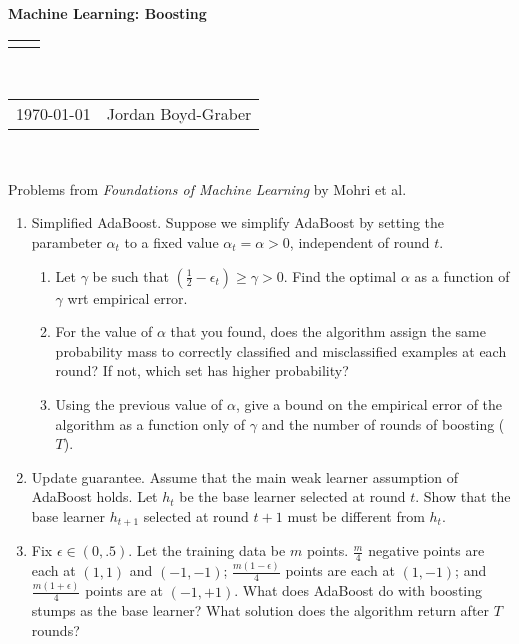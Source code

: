 \documentclass[12pt]{article}
\renewcommand{\title}[1]{\textbf{#1}\\}
\renewcommand{\line}{\begin{tabularx}{\textwidth}{X>{\raggedleft}X}\hline\\\end{tabularx}\\[-0.5cm]}
\newcommand{\leftright}[2]{\begin{tabularx}{\textwidth}{X>{\raggedleft}X}#1%
& #2\\\end{tabularx}\\[-0.5cm]}
\begin{document}
\title{Machine Learning: Boosting}
\line
\leftright{\today}{Jordan Boyd-Graber} %

\begin{center}
  Problems from \emph{Foundations of Machine Learning} by Mohri et al.
\end{center}

\begin{enumerate}
  \item Simplified AdaBoost.  Suppose we simplify AdaBoost by setting
    the parambeter $\alpha_t$ to a fixed value $\alpha_t = \alpha> 0$,
    independent of round $t$.
    \begin{enumerate}
      \item Let $\gamma$ be such that $\left(\frac{1}{2} - \epsilon_t \right)
        \geq \gamma > 0$.  Find the optimal $\alpha$ as a function of $\gamma$
        wrt empirical error.

     \item For the value of $\alpha$ that you found, does the algorithm assign
       the same probability mass to correctly classified and misclassified
       examples at each round?  If not, which set has higher probability?

     \item Using the previous value of $\alpha$, give a bound on the empirical
       error of the algorithm as a function only of $\gamma$ and the number of
       rounds of boosting ($T$).
    \end{enumerate}

    \item Update guarantee.  Assume that the main weak learner assumption of
      AdaBoost holds.  Let $h_t$ be the base learner selected at round $t$.  Show
      that the base learner $h_{t+1}$ selected at round $t+1$ must be different
      from $h_t$.

    \item Fix $\epsilon \in (0, .5)$.  Let the training data be $m$
      points.  $\frac{m}{4}$ negative points are each at $(1,1)$ and
      $(-1, -1)$; $\frac{m (1 - \epsilon)}{4}$ points are each at $(1,
      -1)$; and $\frac{m (1 + \epsilon)}{4}$ points are at $(-1, +1)$.
      What does AdaBoost do with boosting stumps as the base learner?
      What solution does the algorithm return after $T$ rounds?

\end{enumerate}
\end{document}
